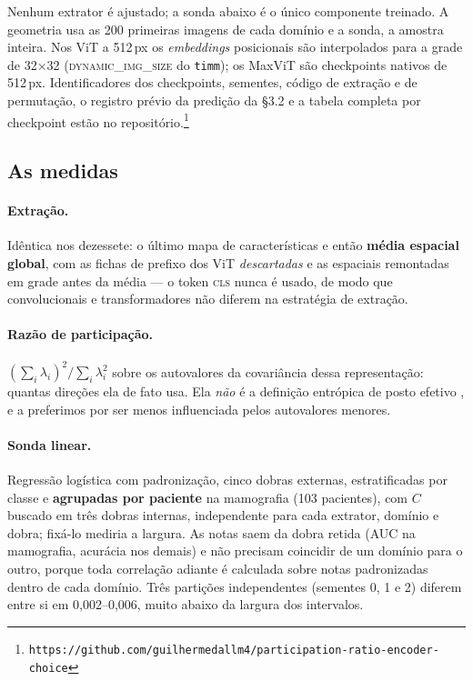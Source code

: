 \documentclass{esannV2}
\begin{document}
Nenhum extrator é ajustado; a sonda abaixo é o único componente treinado. A
geometria usa as 200 primeiras imagens de cada domínio e a sonda, a amostra
inteira. Nos ViT a 512\,px os \emph{embeddings} posicionais são interpolados
para a grade de 32$\times$32 (\textsc{dynamic\_img\_size} do \texttt{timm}); os
MaxViT são checkpoints nativos de 512\,px. Identificadores dos checkpoints,
sementes, código de extração e de permutação, o registro prévio da predição da
§3.2 e a tabela completa por checkpoint estão no
repositório.\footnote{\texttt{https://github.com/guilhermedallm4/participation-ratio-encoder-choice}}

\subsection{As medidas}

\paragraph{Extração.} Idêntica nos dezessete: o último mapa de características
e então \textbf{média espacial global}, com as fichas de prefixo dos ViT
\emph{descartadas} e as espaciais remontadas em grade antes da média --- o
token \textsc{cls} nunca é usado, de modo que convolucionais e transformadores
não diferem na estratégia de extração.

\paragraph{Razão de participação.} $(\sum_i \lambda_i)^2/\sum_i \lambda_i^2$
sobre os autovalores da covariância dessa representação: quantas direções ela
de fato usa. Ela \emph{não} é a definição entrópica de posto efetivo
\cite{EffRank}, e a preferimos por ser menos influenciada pelos autovalores
menores.

\paragraph{Sonda linear.} Regressão logística com padronização, cinco dobras
externas, estratificadas por classe e \textbf{agrupadas por paciente} na
mamografia (103 pacientes), com $C$ buscado em três dobras internas,
independente para cada extrator, domínio e dobra; fixá-lo mediria a largura. As notas saem da dobra retida (AUC na mamografia, acurácia nos demais) e
não precisam coincidir de um domínio para o outro, porque toda correlação adiante é
calculada sobre notas padronizadas dentro de cada domínio. Três partições independentes (sementes 0, 1 e 2) diferem entre si
em 0,002--0,006, muito abaixo da largura dos intervalos.
\end{document}
